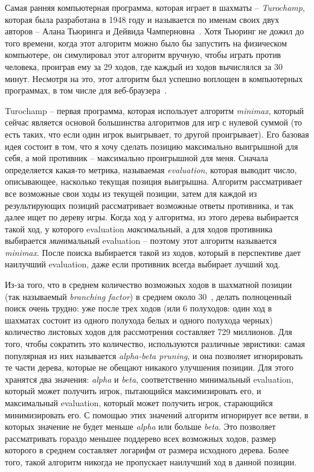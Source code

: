 \documentclass{article}
\begin{document}
Самая ранняя компьютерная программа, которая играет в шахматы --
\emph{Turochamp}, которая была разработана в 1948 году 
и называется по именам своих двух авторов -- Алана Тьюринга и Дейвида Чамперновна~\cite{turochamp}.
Хотя Тьюринг не дожил до того времени, когда этот алгоритм можно было бы запустить на физическом компьютере,
он симулировал этот алгоритм вручную, чтобы играть против человека,
проиграв ему за 29 ходов,
где каждый из ходов вычислялся за 30 минут. 
Несмотря на это, этот алгоритм был успешно воплощен в компьютерных программах,
в том числе для веб-браузера~\cite{nimturochamp}.


Turochamp -- первая программа, которая использует алгоритм \emph{minimax},
который сейчас является основой большинства алгоритмов для игр с нулевой суммой
(то есть таких, что если один игрок выигрывает, то другой проигрывает).
Его базовая идея состоит в том,
что я хочу сделать позицию максимально выигрышной для себя,
а мой противник -- максимально проигрышной для меня.
Сначала определяется какая-то метрика, называемая \emph{evaluation},
которая выводит число, описывающее, насколько текущая позиция выигрышна.
Алгоритм рассматривает все возможные свои ходы из текущей позиции,
затем для каждой из результирующих позиций рассматривает возможные ответы противника,
и так далее ищет по дереву игры.
Когда ход у алгоритма, из этого дерева выбирается такой ход,
у которого evaluation \emph{макс}имальный,
а для ходов противника выбирается \emph{мин}имальный evaluation --
поэтому этот алгоритм называется \emph{minimax}.
После поиска выбирается такой из ходов,
который в перспективе дает наилучший evaluation,
даже если противник всегда выбирает лучший ход.

Из-за того, что в среднем количество возможных ходов в шахматной позиции
(так называемый \emph{branching factor})
в среднем около 30~\cite{chess-se-branching-factor},
делать полноценный поиск очень трудно:
уже после трех ходов (или 6 полуходов: один ход в шахматах состоит из одного полухода белых и одного полухода черных)
количество листовых ходов для рассмотрения составляет 729 миллионов.
Для того, чтобы сократить это количество,
используются различные эвристики: самая популярная из них называется \emph{alpha-beta pruning},
и она позволяет игнорировать те части дерева, которые не обещают никакого улучшения позиции.
Для этого хранятся два значения: \emph{alpha} и \emph{beta},
соответственно минимальный evaluation, который может получить игрок, пытающийся максимизировать его,
и максимальный evaluation, который может получить игрок, старающийся минимизировать его.
С помощью этих значений алгоритм игнорирует все ветви,
в которых значение не будет меньше \emph{alpha} или больше \emph{beta}.
Это позволяет рассматривать гораздо меньшее поддерево всех возможных ходов,
размер которого в среднем составляет логарифм от размера исходного дерева.
Более того, такой алгоритм никогда не пропускает наилучший ход в данной позиции.
\end{document}
